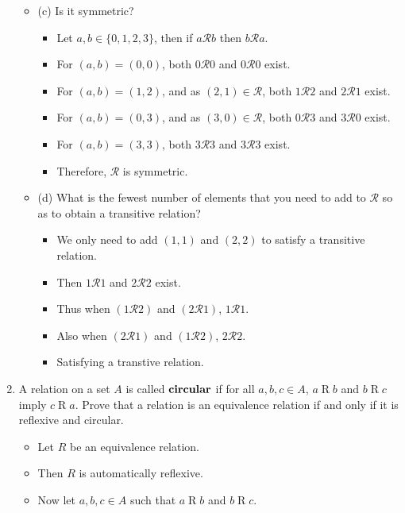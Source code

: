 \documentclass[letterpaper,12pt]{article}
\begin{document}
\begin{enumerate}
\begin{itemize}
\begin{itemize}
	\end{itemize}
	\item (c) Is it symmetric?
	\begin{itemize}
	\item Let $a,b \in \{0,1,2,3\}$, then if $a \mathrel \mathcal{R} b$ then $b \mathrel \mathcal{R} a$.
	\item For $(a,b) = (0,0) $, both $ 0 \mathrel \mathcal{R} 0$ and $ 0 \mathrel \mathcal{R} 0$ exist.
	\item For $(a,b) = (1,2)$, and as $(2,1) \in \mathcal{R}$, both $1 \mathrel \mathcal{R} 2$ and $2 \mathrel \mathcal{R} 1$ exist.
	\item For $(a,b) = (0,3)$, and as $(3,0) \in \mathcal{R}$, both $0 \mathrel \mathcal{R} 3$ and $3 \mathrel \mathcal{R} 0$ exist.
	\item For $(a,b) = (3,3)$, both $ 3 \mathrel \mathcal{R} 3$ and $ 3 \mathrel \mathcal{R} 3$ exist.
	\item Therefore, $\mathcal{R}$ is symmetric.
	\end{itemize}
	\item (d) What is the fewest number of elements that you need to add to $\mathcal{R}$ so as to obtain a transitive relation?
	\begin{itemize}
	\item We only need to add $(1,1)$ and $(2,2)$ to satisfy a transitive relation.
	\item Then $1 \mathrel \mathcal{R} 1$ and $2 \mathrel \mathcal{R} 2$ exist.
	\item Thus when $(1 \mathrel \mathcal R 2) $ and $ (2 \mathrel \mathcal R 1)$, $1 \mathrel \mathcal R 1$.
	\item Also when $ (2 \mathrel \mathcal R 1)$ and $(1 \mathrel \mathcal R 2) $, $2 \mathrel \mathcal R 2$.
	\item Satisfying a transtive relation.
	\end{itemize}
\end{itemize}
\item A relation on a set $A$ is called $\bold{circular}$ if for all $a,b,c \in A$, $a \mathrel R b$ and $b \mathrel R c$ imply $c \mathrel R a$. Prove that a relation is an equivalence relation if and only if it is reflexive and circular.
\begin{itemize}
\item Let $R$ be an equivalence relation.
\item Then $R$ is automatically reflexive.
\item Now let $a,b,c \in A$ such that $a \mathrel R b$ and $ b \mathrel R c$.

\end{itemize}
\end{enumerate}
\end{document}
